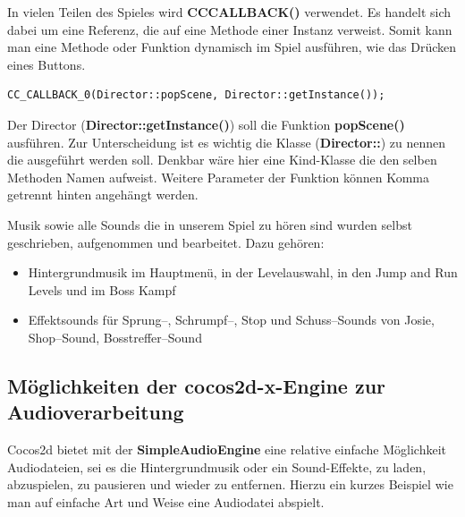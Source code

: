 In vielen Teilen des Spieles wird \textbf{CC\textunderscore CALLBACK()} verwendet. Es handelt sich dabei um eine Referenz, die auf eine Methode einer Instanz verweist. Somit kann man eine Methode oder Funktion dynamisch im Spiel ausführen, wie das Drücken eines Buttons.

\begin{lstlisting}[style=singleline]
CC_CALLBACK_0(Director::popScene, Director::getInstance());
\end{lstlisting}

Der Director (\textbf{Director::getInstance()}) soll die Funktion \textbf{popScene()} ausführen. Zur Unterscheidung ist es wichtig die Klasse (\textbf{Director::}) zu nennen die ausgeführt werden soll. Denkbar wäre hier eine Kind-Klasse die den selben Methoden Namen aufweist. 
Weitere Parameter der Funktion können Komma getrennt hinten angehängt werden.



\label{sec:2_Tilemaps}



\label{sec:2_Musik}
Musik sowie alle Sounds die in unserem Spiel \gamename zu hören sind wurden selbst geschrieben, aufgenommen und bearbeitet. Dazu gehören:

\begin{itemize}
\item Hintergrundmusik im Hauptmenü, in der Levelauswahl, in den Jump and Run Levels und im Boss Kampf
\item Effektsounds für Sprung--, Schrumpf--, Stop und Schuss--Sounds von Josie, Shop--Sound, Bosstreffer--Sound
\end{itemize}


\subsection{Möglichkeiten der cocos2d-x-Engine zur Audioverarbeitung}
Cocos2d bietet mit der \textbf{SimpleAudioEngine} eine relative einfache Möglichkeit Audio\-dateien, sei es die Hintergrundmusik oder ein Sound-Effekte, zu laden, abzuspielen, zu pausieren und wieder zu entfernen. Hierzu ein kurzes Beispiel wie man auf einfache Art und Weise eine Audiodatei abspielt.

